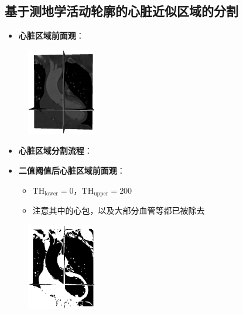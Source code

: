 \subsection[心脏分割]{基于测地学活动轮廓的心脏近似区域的分割}

\begin{frame}
\begin{itemize}
  \item \textbf{心脏区域前面观}：
\end{itemize}
\begin{figure}[t]
\centering
\includegraphics[height=1.5in]{../../Figures/gac/heart/original.eps}
\end{figure}
\end{frame}

\begin{frame}
\begin{itemize}
  \item \textbf{心脏区域分割流程}：
\end{itemize}
\begin{figure}[t]
\centering

\end{figure}
\end{frame}

\begin{frame}
\begin{itemize}
  \item \textbf{二值阈值后心脏区域前面观}：
  \begin{itemize}
    \item $\text{TH}_{\text{lower}} = 0$，$\text{TH}_{\text{upper}} = 200$
    \item 注意其中的心包，以及大部分血管等都已被除去
  \end{itemize}
\end{itemize}
\begin{figure}[t]
\centering
\includegraphics[height=1.5in]{../../Figures/gac/heart/binary_threshold.eps}
\end{figure}
\end{frame}

